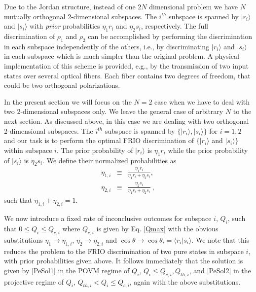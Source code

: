\documentclass[aps,pra,twocolumn,eqsecnum,showpacs]{revtex4}
\begin{document}
Due to the Jordan structure, instead of one $2N$ dimensional problem we have $N$ mutually orthogonal 2-dimensional subspaces. The $i^{th}$ subspace is spanned by $\vert r_i \rangle$ and  $\vert s_i \rangle$ with \emph{prior} probabilities $\eta_1 r_i$ and $\eta_2 s_i$, respectively.  The full discrimination of $\rho_{1}$ and $\rho_{2}$ can be accomplished by performing the discrimination in each subspace independently of the others, i.e., by discriminating $\vert r_i \rangle$ and  $\vert s_i \rangle$ in each subspace which is much simpler than the original problem. A physical implementation of this scheme is provided, e.g., by  the transmission of two input states over several optical fibers. Each fiber contains two degrees of freedom, that could be two orthogonal polarizations.

In the present section we will focus on the $N=2$ case when we have to deal with two 2-dimensional  subspaces only. We leave the general case of arbitrary $N$ to the next section.  
As discussed above, in this case we are dealing with two orthogonal 2-dimensional subspaces. 
The $i^{th}$ subspace is spanned by $\{\vert r_{i}\rangle,\vert s_{i}\rangle\}$ for $i=1,2$ and our task is to perform the optimal FRIO discrimination of  $\{\vert r_{i}\rangle$ and $\vert s_{i}\rangle\}$ within subspace $i$. The prior probability of $\vert r_{i}\rangle$ is $\eta_{1} r_{i}$ while the prior probability of $\vert s_{i}\rangle$ is $\eta_{2} s_{i}$. We define their normalized probabilities as 
\begin{eqnarray}
\eta_{1,i} &\equiv& \frac{\eta_{1} r_{i}}{\eta_{1} r_{i} + \eta_{2} s_{i}}, \nonumber \\ 
\eta_{2,i} &\equiv& \frac{\eta_{2} s_{i}}{\eta_{1} r_{i} + \eta_{2} s_{i}} \ ,
\label{etaij}
\end{eqnarray} 
such that $\eta_{1,i} + \eta_{2,i} = 1$.   

We now introduce a fixed rate of inconclusive outcomes for subspace $i$, $Q_{i}$,  such that $0 \leq Q_{i} \leq Q_{c,i}$ where $Q_{c,i}$ is given by Eq. \eqref{Qmax} with the obvious substitutions $\eta_{1} \rightarrow \eta_{1,i}$, $\eta_{2} \rightarrow \eta_{2,i}$ and $\cos \theta \rightarrow \cos \theta_{i} = \langle r_{i}\vert s_{i}\rangle$. We note that this reduces the problem to the FRIO discrimination of two pure states in subspace $i$, with prior probabilities given above. It follows immediately that the solution is given by \eqref{PeSol1} in the POVM regime of $Q_{i}$, $Q_{i} \leq Q_{c,i}, Q_{th,i}$, and \eqref{PeSol2} in the projective regime of $Q_{i}$, $Q_{th,i} < Q_{i} \leq Q_{c,i}$, again with the above substitutions.  
\end{document}
